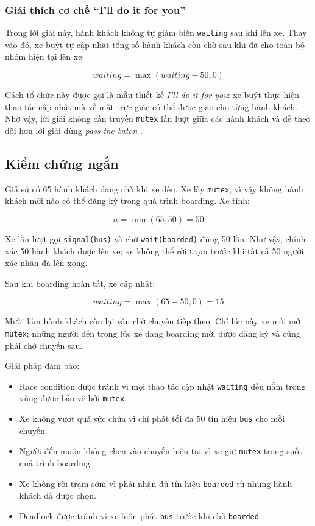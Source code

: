 \subsubsection*{Giải thích cơ chế ``I'll do it for you''}

Trong lời giải này, hành khách không tự giảm biến \texttt{waiting} sau
khi lên xe. Thay vào đó, xe buýt tự cập nhật tổng số hành khách còn chờ
sau khi đã cho toàn bộ nhóm hiện tại lên xe:

\[
waiting = \max(waiting - 50, 0)
\]

Cách tổ chức này được gọi là mẫu thiết kế
\textit{I'll do it for you}: xe buýt thực hiện thao tác cập nhật mà về
mặt trực giác có thể được giao cho từng hành khách. Nhờ vậy, lời giải
không cần truyền \texttt{mutex} lần lượt giữa các hành khách và dễ theo
dõi hơn lời giải dùng \textit{pass the baton}
\cite[Sec.~7.4.3, p.~217]{downey2016}.

\subsection{Kiểm chứng ngắn}

Giả sử có 65 hành khách đang chờ khi xe đến. Xe lấy
\texttt{mutex}, vì vậy không hành khách mới nào có thể đăng ký trong
quá trình boarding. Xe tính:

\[
n = \min(65, 50) = 50
\]

Xe lần lượt gọi \texttt{signal(bus)} và chờ
\texttt{wait(boarded)} đúng 50 lần. Như vậy, chính xác 50 hành khách
được lên xe; xe không thể rời trạm trước khi tất cả 50 người xác nhận
đã lên xong.

Sau khi boarding hoàn tất, xe cập nhật:

\[
waiting = \max(65 - 50, 0) = 15
\]

Mười lăm hành khách còn lại vẫn chờ chuyến tiếp theo. Chỉ lúc này xe
mới mở \texttt{mutex}; những người đến trong lúc xe đang boarding mới
được đăng ký và cũng phải chờ chuyến sau.

Giải pháp đảm bảo:

\begin{itemize}
\item Race condition được tránh vì mọi thao tác cập nhật
\texttt{waiting} đều nằm trong vùng được bảo vệ bởi
\texttt{mutex}.
\item Xe không vượt quá sức chứa vì chỉ phát tối đa 50 tín hiệu
\texttt{bus} cho mỗi chuyến.
\item Người đến muộn không chen vào chuyến hiện tại vì xe giữ
\texttt{mutex} trong suốt quá trình boarding.
\item Xe không rời trạm sớm vì phải nhận đủ tín hiệu
\texttt{boarded} từ những hành khách đã được chọn.
\item Deadlock được tránh vì xe luôn phát \texttt{bus} trước khi
chờ \texttt{boarded}.
\end{itemize}

